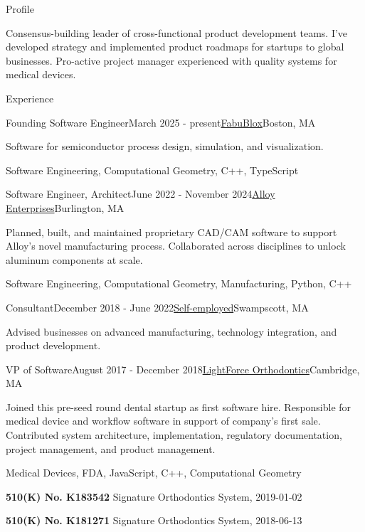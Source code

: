 \documentclass{resume}
\begin{document}
\begin{rSection}{Profile}
\item Consensus-building leader of cross-functional product development teams. I've developed strategy and implemented product roadmaps for startups to global businesses. Pro-active project manager experienced with quality systems for medical devices.
\end{rSection}

\begin{rSection}{Experience}

\begin{rSubsection}{Founding Software Engineer}{March 2025 - present}{\href{https://fabublox.com}{FabuBlox}}{Boston, MA}
\item Software for semiconductor process design, simulation, and visualization.
\item Software Engineering, Computational Geometry, C++, TypeScript    
\end{rSubsection}
    
\begin{rSubsection}{Software Engineer, Architect}{June 2022 - November 2024}{\href{https://alloyenterprises.co}{Alloy Enterprises}}{Burlington, MA}
\item Planned, built, and maintained proprietary CAD/CAM software to support Alloy's novel manufacturing process. Collaborated across disciplines to unlock aluminum components at scale.
\item Software Engineering, Computational Geometry, Manufacturing, Python, C++
\end{rSubsection}

\begin{rSubsection}{Consultant}{December 2018 - June 2022}{\href{https://metatooth.com/services}{Self-employed}}{Swampscott, MA}
\item Advised businesses on advanced manufacturing, technology integration, and product development.
\end{rSubsection}

\begin{rSubsection}{VP of Software}{August 2017 - December 2018}{\href{https://lightforceortho.com}{LightForce Orthodontics}}{Cambridge, MA}
\item Joined this pre-seed round dental startup as first software hire. Responsible for medical device and workflow software in support of company's first sale. Contributed system architecture, implementation, regulatory documentation, project management, and product management.
\item Medical Devices, FDA, JavaScript, C++, Computational Geometry
\item \textbf{510(K) No. K183542} Signature Orthodontics System, 2019-01-02
\item \textbf{510(K) No. K181271} Signature Orthodontics System, 2018-06-13
\end{rSubsection}


\end{rSection}
\end{document}
